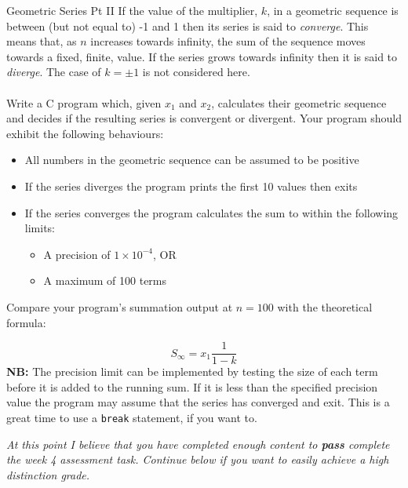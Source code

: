 \documentclass{lab}
\begin{document}
\begin{task}{Geometric Series Pt II}{}
If the value of the multiplier, $k$, in a geometric sequence is between (but not equal to) -1 and 1 then its series is said to \textit{converge}. This means that, as $n$ increases towards infinity, the sum of the sequence moves towards a fixed, finite, value. If the series grows towards infinity then it is said to \textit{diverge}. The case of $k = \pm1$ is not considered here.
\\ \\
Write a C program which, given $x_1$ and $x_2$, calculates their geometric sequence and decides if the resulting series is convergent or divergent. Your program should exhibit the following behaviours: 
\begin{itemize}
\item All numbers in the geometric sequence can be assumed to be positive
\item If the series diverges the program prints the first 10 values then exits
\item If the series converges the program calculates the sum to within the following limits:
	\begin{itemize}
		\item A precision of $1 \times 10^{-4}$, OR
		\item A maximum of 100 terms
	\end{itemize}
\end{itemize}

Compare your program's summation output at $n=100$ with the theoretical formula:

\begin{equation}
S_\infty = x_1 \frac{1}{1-k}
\end{equation}
\textbf{NB:} The precision limit can be implemented by testing the size of each term before it is added to the running sum. If it is less than the specified precision value the program may assume that the series has converged and exit. This is a great time to use a \texttt{break} statement, if you want to.
\end{task}

{\huge\textit{At this point I believe that you have completed enough content to \textbf{pass} complete the week 4 assessment task. Continue below if you want to easily achieve a high distinction grade.}}
\end{document}
